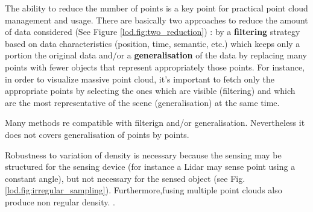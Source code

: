 	The ability to reduce the number of points is a key point for practical point cloud management and usage.
	There are basically two approaches to reduce the amount of data considered (See Figure \ref{lod.fig:two_reduction}) :
	by a \textbf{filtering} strategy based on data characteristics (position, time, semantic, etc.) which keeps only a portion the original data and/or a 
	\textbf{generalisation} of the data by replacing many points with fewer objects that represent appropriately those points. 
	For instance, in order to visualize massive point cloud, it's important to fetch only the appropriate points by selecting the ones which are visible (filtering) and which are the most representative of the scene (generalisation) at the same time.
	
	Many methods re compatible with filterign and/or generalisation.
%	
	Nevertheless it does not covers generalisation of points by points.
	
	Robustness to variation of density is necessary because the sensing may be structured for the sensing device (for instance a Lidar may sense point using a constant angle), but not necessary for the sensed object (see Fig. \ref{lod.fig:irregular_sampling}). Furthermore,fusing multiple point clouds also produce non regular density.
	.
	
